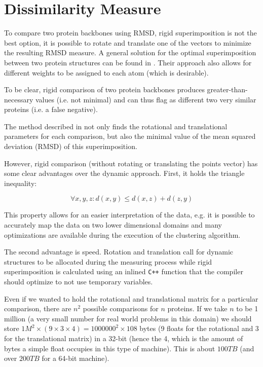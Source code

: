 \documentclass[a4paper,12pt,english]{report}
\begin{document}
\section{Dissimilarity Measure}

To compare two protein backbones using RMSD, rigid superimposition is not the best option, it is possible to rotate and translate one of the vectors to minimize the resulting RMSD measure. A general solution for the optimal superimposition between two protein structures can be found in \cite{superimposition}. Their approach also allows for different weights to be assigned to each atom (which is desirable).

To be clear, rigid comparison of two protein backbones produces greater-than-necessary values (i.e. not minimal) and can thus flag as different two very similar proteins (i.e. a false negative).

The method described in \cite{superimposition} not only finds the rotational and translational parameters for each comparison, but also the minimal value of the mean squared deviation (RMSD) of this superimposition.

However, rigid comparison (without rotating or translating the points vector) has some clear advantages over the dynamic approach. First, it holds the triangle inequality:

$$\forall x,y,z : d(x,y) \leq d(x,z) + d(z,y)$$

This property allows for an easier interpretation of the data, e.g. it is possible to accurately map the data on two lower dimensional domains and many optimizations are available during the execution of the clustering algorithm.

The second advantage is speed. Rotation and translation call for dynamic structures to be allocated during the measuring process while rigid superimposition is calculated using an inlined \texttt{C++} function that the compiler should optimize to not use temporary variables.

Even if we wanted to hold the rotational and translational matrix for a particular comparison, there are $n^2$ possible comparisons for $n$ proteins. If we take $n$ to be 1 million (a very small number for real world problems in this domain) we should store $1M^2 \times (9 \times 3 \times 4) = 1000000^2 \times 108$ bytes (9 floats for the rotational and 3 for the translational matrix) in a 32-bit (hence the 4, which is the amount of bytes a simple float occupies in this type of machine). This is about $100TB$ (and over $200TB$ for a 64-bit machine).
\end{document}
